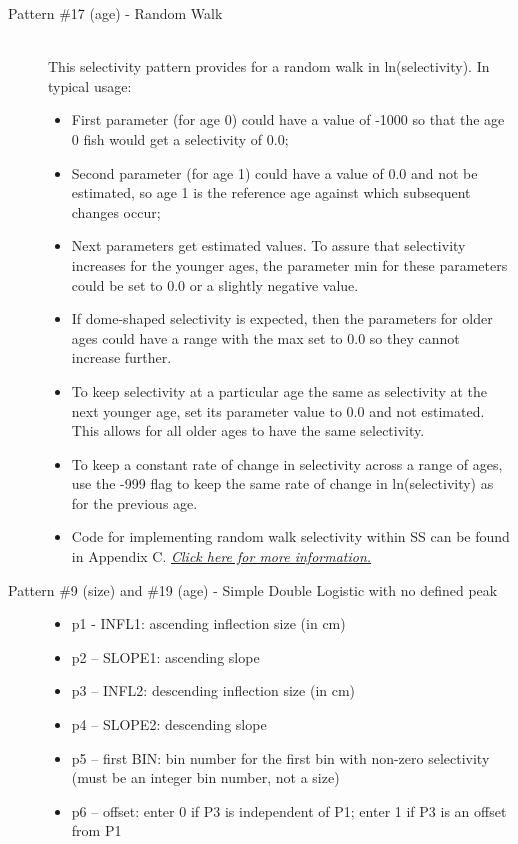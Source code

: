 \begin{description}
	\item[Pattern \#17 (age) - Random Walk]\hfill\\
	This selectivity pattern provides for a random walk in ln(selectivity).  In typical usage:
	\begin{itemize}
		\item First parameter (for age 0) could have a value of -1000 so that the age 0 fish would get a selectivity of 0.0;
		\item 	Second parameter (for age 1) could have a value of 0.0 and not be estimated, so age 1 is the reference age against which subsequent changes occur;
		\item 	Next parameters get estimated values.  To assure that selectivity increases for the younger ages, the parameter min for these parameters could be set to 0.0 or a slightly negative value.
		\item If dome-shaped selectivity is expected, then the parameters for older ages could have a range with the max set to 0.0 so they cannot increase further.
		\item To keep selectivity at a particular age the same as selectivity at the next younger age, set its parameter value to 0.0 and not estimated.  This allows for all older ages to have the same selectivity.
		\item 	To keep a constant rate of change in selectivity across a range of ages, use the -999 flag to keep the same rate of change in ln(selectivity) as for the previous age.
		\item  Code for implementing random walk selectivity within SS can be found in Appendix C. \hyperlink{RandWalkSelex}{\textit{Click here for more information.}}
	\end{itemize}
\end{description}

\begin{description}
	\item[Pattern \#9 (size) and \#19 (age) - Simple Double Logistic with no defined peak]\hfil
	\begin{itemize}
		\item p1 - INFL1:  ascending inflection size (in cm)
		\item p2 – SLOPE1:  ascending slope
		\item p3 – INFL2:  descending inflection size (in cm)
		\item p4 – SLOPE2:  descending slope
		\item p5 – first BIN: bin number for the first bin with non-zero selectivity (must be an integer bin number, not a size)
		\item p6 – offset:  enter 0 if P3 is independent of P1; enter 1 if P3 is an offset from P1
	\end{itemize}
\end{description}

